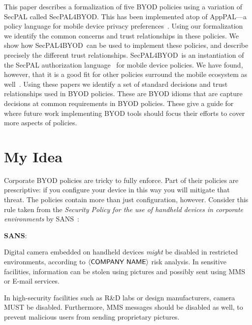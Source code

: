 \documentclass{llncs}
\newcommand{\AppPAL}[0]{SecPAL4BYOD}
\newenvironment{policyrule}[1]{%
  \begin{mdframed}\footnotesize
      \noindent\textbf{\sffamily #1}:~\itshape%
}{%
  \end{mdframed}
}
\begin{document}
This paper describes a formalization of five BYOD policies using a variation of SecPAL called \AppPAL.
This has been implemented atop of AppPAL---a policy language for mobile device privacy preferences~\cite{hallett_apppal_2016}.
Using our formalization we identify the common concerns and trust relationships in these policies.
We show how \AppPAL~can be used to implement these policies, and describe precisely the different trust relationships.
\AppPAL~is an instantiation of the SecPAL authorization language~\cite{becker_secpal:_2010} for mobile device policies.
We have found, however, that it is a good fit for other policies surround the mobile ecosystem as well~\cite{hallett_specifying_2016}.
Using these papers we identify a set of standard decisions and trust relationships used in BYOD policies.
These are BYOD idioms that are capture decisions at common requirements in BYOD policies.
These give a guide for where future work implementing BYOD tools should focus their efforts to cover more aspects of policies.

\section{My Idea}
\label{sec:idea}

Corporate BYOD policies are tricky to fully enforce.
Part of their policies are prescriptive:  if you configure your device in this way you will mitigate that threat.
The policies contain more than just configuration, however.
Consider this rule taken from the \emph{Security Policy for the use of handheld devices in corporate environments} by SANS~\cite{nicholas_r._c._guerin_security_2008}:

\newcommand{\textbra}[1]{\ensuremath{\left\langle \text{\sffamily #1} \right\rangle}}
\begin{policyrule}{SANS}
  Digital camera embedded on handheld devices \emph{might} be disabled in restricted environments, according to \textbra{COMPANY NAME} risk analysis.
  In sensitive facilities, information can be stolen using pictures and possibly sent using MMS or E-mail services.

  In high-security facilities such as R\&D labs or design manufacturers, camera MUST be disabled.
  Furthermore, MMS messages should be disabled as well, to prevent malicious users from sending proprietary pictures.
\end{policyrule}
\end{document}
